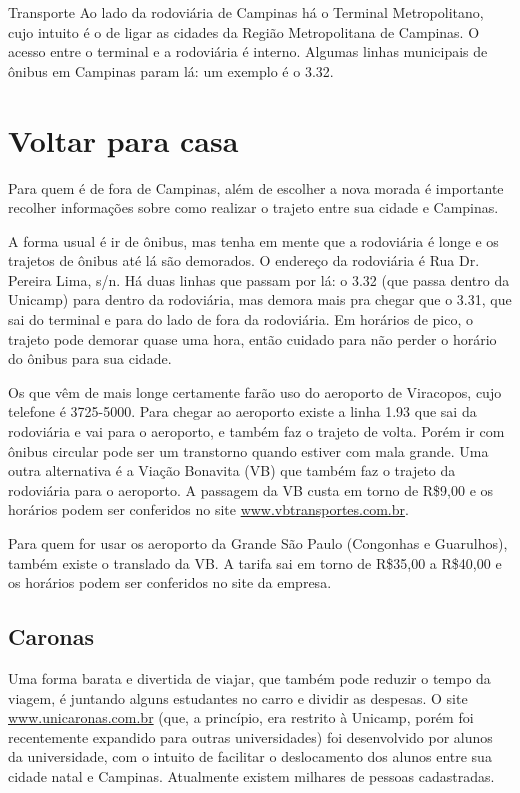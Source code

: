 \begin{story}{Transporte}
Ao lado da rodoviária de Campinas há o Terminal Metropolitano, cujo intuito é o de ligar as cidades da Região Metropolitana de Campinas. O acesso entre o terminal e a rodoviária é interno. Algumas linhas municipais de ônibus em Campinas param lá: um exemplo é o 3.32.

\section*{Voltar para casa}

Para quem é de fora de Campinas, além de escolher a nova morada é importante recolher informações sobre como realizar o trajeto entre sua cidade e Campinas.

A forma usual é ir de ônibus, mas tenha em mente que a rodoviária é longe e os trajetos de ônibus até lá são demorados. O endereço da rodoviária é Rua Dr. Pereira Lima, s/n. Há duas linhas que passam por lá: o 3.32 (que passa dentro da Unicamp) para dentro da rodoviária, mas demora mais pra chegar que o 3.31, que sai do terminal e para do lado de fora da rodoviária. Em horários de pico, o trajeto pode demorar quase uma hora, então cuidado para não perder o horário do ônibus para sua cidade.

Os que vêm de mais longe certamente farão uso do aeroporto de Viracopos, cujo telefone é 3725-5000. Para chegar ao aeroporto existe a linha 1.93 que sai da rodoviária e vai para o aeroporto, e também faz o trajeto de volta. Porém ir com ônibus circular pode ser um transtorno quando estiver com mala grande. Uma outra alternativa é a Viação Bonavita (VB) que também faz o trajeto da rodoviária para o aeroporto. A passagem da VB custa em torno de R\$9,00 e os horários podem ser conferidos no site \url{www.vbtransportes.com.br}.

Para quem for usar os aeroporto da Grande São Paulo (Congonhas e Guarulhos), também existe o translado da VB. A tarifa sai em torno de R\$35,00 a R\$40,00 e os horários podem ser conferidos no site da empresa.

\subsection*{Caronas}

Uma forma barata e divertida de viajar, que também pode reduzir o tempo da viagem, é juntando alguns estudantes no carro e dividir as despesas. O site \url{www.unicaronas.com.br} (que, a princípio, era restrito à Unicamp, porém foi recentemente expandido para outras universidades) foi desenvolvido por alunos da universidade, com o intuito de facilitar o deslocamento dos alunos entre sua cidade natal e Campinas. Atualmente existem milhares de pessoas cadastradas.


\end{story}
